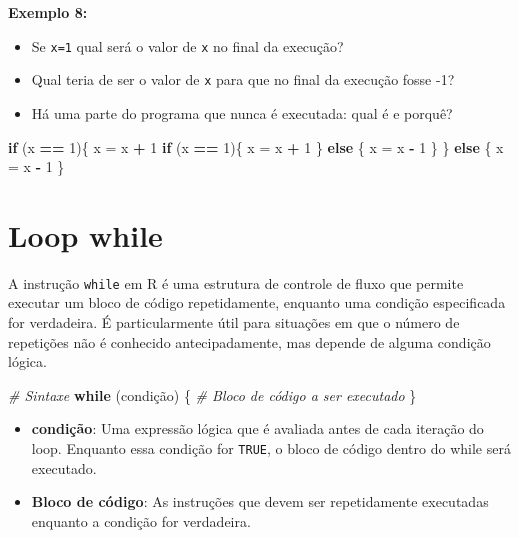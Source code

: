 \documentclass[
]{book}
\newenvironment{Shaded}{\begin{snugshade}}{\end{snugshade}}
\newcommand{\CommentTok}[1]{\textcolor[rgb]{0.56,0.35,0.01}{\textit{#1}}}
\newcommand{\ControlFlowTok}[1]{\textcolor[rgb]{0.13,0.29,0.53}{\textbf{#1}}}
\newcommand{\DecValTok}[1]{\textcolor[rgb]{0.00,0.00,0.81}{#1}}
\newcommand{\NormalTok}[1]{#1}
\newcommand{\OtherTok}[1]{\textcolor[rgb]{0.56,0.35,0.01}{#1}}
\newcommand{\SpecialCharTok}[1]{\textcolor[rgb]{0.81,0.36,0.00}{\textbf{#1}}}
\theoremstyle{definition}
\theoremstyle{definition}
\theoremstyle{definition}
\theoremstyle{definition}
\theoremstyle{remark}
\begin{document}
\textbf{Exemplo 8:}

\begin{itemize}
\item
  Se \texttt{x=1} qual será o valor de \texttt{x} no final da execução?
\item
  Qual teria de ser o valor de \texttt{x} para que no final da execução fosse -1?
\item
  Há uma parte do programa que nunca é executada: qual é e porquê?
\end{itemize}

\begin{Shaded}
\begin{Highlighting}[]
\ControlFlowTok{if}\NormalTok{ (x }\SpecialCharTok{==} \DecValTok{1}\NormalTok{)\{  }
\NormalTok{  x }\OtherTok{=}\NormalTok{ x }\SpecialCharTok{+} \DecValTok{1}  
  \ControlFlowTok{if}\NormalTok{ (x }\SpecialCharTok{==} \DecValTok{1}\NormalTok{)\{    }
\NormalTok{    x }\OtherTok{=}\NormalTok{ x }\SpecialCharTok{+} \DecValTok{1}  
\NormalTok{  \} }\ControlFlowTok{else}\NormalTok{ \{   }
\NormalTok{      x }\OtherTok{=}\NormalTok{ x }\SpecialCharTok{{-}} \DecValTok{1}  
\NormalTok{  \}}
\NormalTok{\} }\ControlFlowTok{else}\NormalTok{ \{  }
\NormalTok{    x }\OtherTok{=}\NormalTok{ x }\SpecialCharTok{{-}} \DecValTok{1}
\NormalTok{\}}
\end{Highlighting}
\end{Shaded}

\chapter{Loop while}\label{loop-while}

A instrução \texttt{while} em R é uma estrutura de controle de fluxo que permite executar um bloco de código repetidamente, enquanto uma condição especificada for verdadeira. É particularmente útil para situações em que o número de repetições não é conhecido antecipadamente, mas depende de alguma condição lógica.

\begin{Shaded}
\begin{Highlighting}[]
\CommentTok{\# Sintaxe}
\ControlFlowTok{while}\NormalTok{ (condição) \{}
  \CommentTok{\# Bloco de código a ser executado}
\NormalTok{\}}
\end{Highlighting}
\end{Shaded}

\begin{itemize}
\item
  \textbf{condição}: Uma expressão lógica que é avaliada antes de cada iteração do loop. Enquanto essa condição for \texttt{TRUE}, o bloco de código dentro do while será executado.
\item
  \textbf{Bloco de código}: As instruções que devem ser repetidamente executadas enquanto a condição for verdadeira.
\end{itemize}
\end{document}
